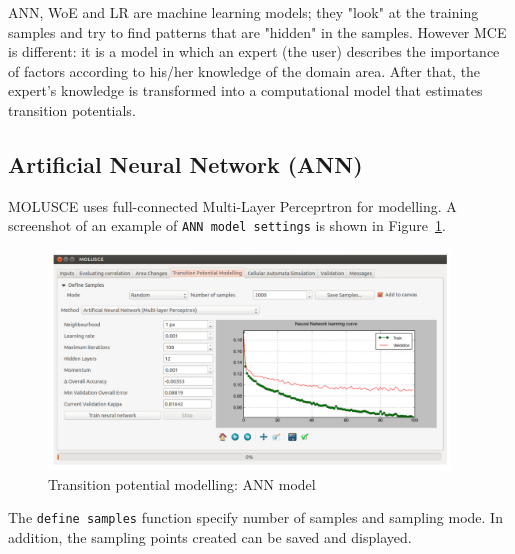 \documentclass{report}
\begin{document}
ANN, WoE and LR are machine learning models; they "look" at the training samples and try 
to find patterns that are "hidden" in the samples. However MCE is different: 
it is a model in which an expert (the user) describes the importance of factors
according to his/her knowledge of the domain area. After that, the expert's knowledge is transformed into
a computational model that estimates transition potentials.




\subsection{Artificial Neural Network (ANN)}
MOLUSCE uses full-connected Multi-Layer Perceprtron for modelling.
A screenshot of an example of \verb+ANN model settings+ is shown in Figure~\ref{fig:ann_model}.

\begin{figure}[h!]
\centering
\includegraphics[width=0.95\textwidth]{img/ann_model.png}
\caption{Transition potential modelling: ANN model}
\label{fig:ann_model}
\end{figure}

The \verb+define samples+ function specify number of samples and sampling mode. In addition, the
sampling points created can be saved and displayed.
\end{document}
